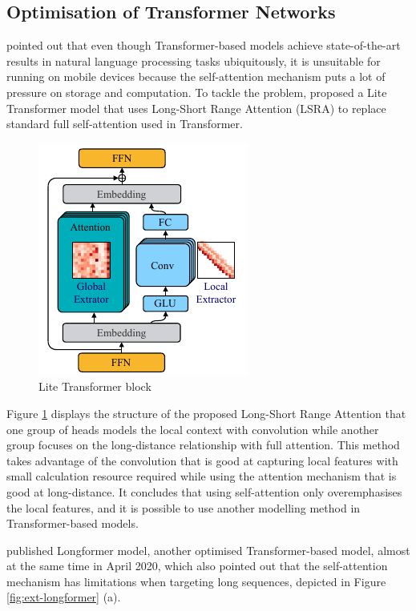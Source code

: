 \subsection{Optimisation of Transformer Networks}
\citet{wu2020lite} pointed out that even though Transformer-based models achieve state-of-the-art results in natural language processing tasks ubiquitously, it is unsuitable for running on mobile devices because the self-attention mechanism puts a lot of pressure on storage and computation.
To tackle the problem, \citet{wu2020lite} proposed a Lite Transformer model that uses Long-Short Range Attention (LSRA) to replace standard full self-attention used in Transformer.

\begin{figure}
    \vspace*{-1em}
    \includegraphics[width=.48\textwidth]{literature/imgs/ext-2-lite-transformer.pdf}
    \caption{Lite Transformer block \cite{wu2020lite}}
    \label{fig:ext-2-lite-transformer}
\end{figure}

Figure \ref{fig:ext-2-lite-transformer} displays the structure of the proposed Long-Short Range Attention that one group of heads models the local context with convolution while another group focuses on the long-distance relationship with full attention.
This method takes advantage of the convolution that is good at capturing local features with small calculation resource required while using the attention mechanism that is good at long-distance.
It concludes that using self-attention only overemphasises the local features, and it is possible to use another modelling method in Transformer-based models.

\citet{beltagy2020longformer} published Longformer model, another optimised Transformer-based model, almost at the same time in April 2020, which also pointed out that the self-attention mechanism has limitations when targeting long sequences, depicted in Figure \ref{fig:ext-longformer} (a).

